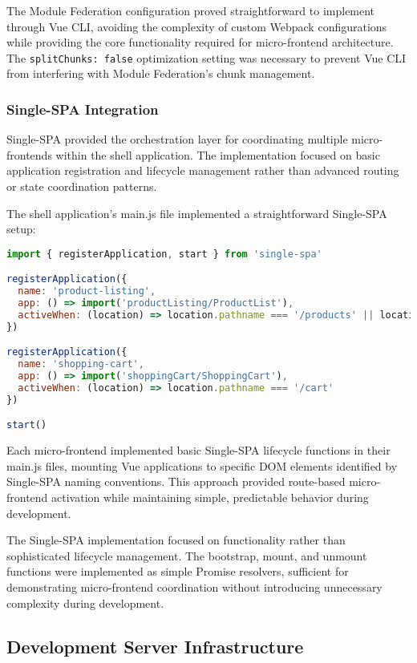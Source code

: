 \documentclass[12pt,a4paper]{report}
\begin{document}
The Module Federation configuration proved straightforward to implement through Vue CLI, avoiding the complexity of custom Webpack configurations while providing the core functionality required for micro-frontend architecture. The \texttt{splitChunks: false} optimization setting was necessary to prevent Vue CLI from interfering with Module Federation's chunk management.

\subsubsection{Single-SPA Integration}

Single-SPA provided the orchestration layer for coordinating multiple micro-frontends within the shell application. The implementation focused on basic application registration and lifecycle management rather than advanced routing or state coordination patterns.

The shell application's main.js file implemented a straightforward Single-SPA setup:

\begin{lstlisting}[language=JavaScript, caption=Single-SPA Application Registration]
import { registerApplication, start } from 'single-spa'

registerApplication({
  name: 'product-listing',
  app: () => import('productListing/ProductList'),
  activeWhen: (location) => location.pathname === '/products' || location.pathname === '/'
})

registerApplication({
  name: 'shopping-cart',
  app: () => import('shoppingCart/ShoppingCart'),
  activeWhen: (location) => location.pathname === '/cart'
})

start()
\end{lstlisting}

Each micro-frontend implemented basic Single-SPA lifecycle functions in their main.js files, mounting Vue applications to specific DOM elements identified by Single-SPA naming conventions. This approach provided route-based micro-frontend activation while maintaining simple, predictable behavior during development.

The Single-SPA implementation focused on functionality rather than sophisticated lifecycle management. The bootstrap, mount, and unmount functions were implemented as simple Promise resolvers, sufficient for demonstrating micro-frontend coordination without introducing unnecessary complexity during development.

\subsection{Development Server Infrastructure}
\end{document}
